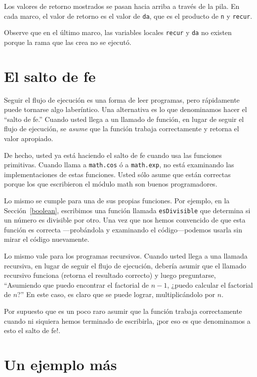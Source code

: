 Los valores de retorno mostrados se pasan hacia arriba a través de
la pila. En cada marco, el valor de retorno es el valor de \texttt{da},
que es el producto de \texttt{n} y \texttt{recur}.

Observe que en el último marco, las variables locales \texttt{recur}
y \texttt{da} no existen porque la rama que las crea no se ejecutó.

\section{El salto de fe}

 

Seguir el flujo de ejecución es una forma de leer programas, pero
rápidamente puede tornarse algo laberíntico. Una alternativa es lo
que denominamos hacer el ``salto de fe.'' Cuando usted llega a un
llamado de función, en lugar de seguir el flujo de ejecución, se {\em
asume} que la función trabaja correctamente y retorna el valor apropiado.

De hecho, usted ya está haciendo el salto de fe cuando usa las funciones
primitivas. Cuando llama a \texttt{math.cos} ó a \texttt{math.exp},
no está examinando las implementaciones de estas funciones. Usted
sólo asume que están correctas porque los que escribieron el módulo
math son buenos programadores.

Lo mismo se cumple para una de sus propias funciones. Por ejemplo,
en la Sección~\ref{boolean}, escribimos una función llamada \texttt{esDivisible}
que determina si un número es divisible por otro. Una vez que nos
hemos convencido de que esta función es correcta —probándola y examinando
el código—podemos usarla sin mirar el código nuevamente.

Lo mismo vale para los programas recursivos. Cuando usted llega a
una llamada recursiva, en lugar de seguir el flujo de ejecución, debería
asumir que el llamado recursivo funciona (retorna el resultado correcto)
y luego preguntarse, ``Asumiendo que puedo encontrar el factorial
de $n-1$, ¿puedo calcular el factorial de $n$?'' En este caso,
es claro que se puede lograr, multiplicándolo por $n$.

Por supuesto que es un poco raro asumir que la función trabaja correctamente
cuando ni siquiera hemos terminado de escribirla, ¡por eso es que
denominamos a esto el salto de fe!.

\section{Un ejemplo más}

